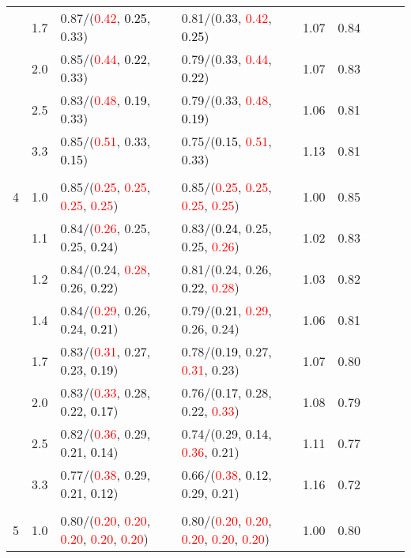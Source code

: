 \documentclass[10pt,a4paper]{report}
\begin{document}
\begin{table}[!htbp]
\begin{center}
{\begin{tabular}{ccllccccc}
			&1.7&0.87/(\textcolor{red}{0.42}, \textcolor{black}{0.25}, 0.33)&0.81/(0.33, \textcolor{red}{0.42}, \textcolor{black}{0.25})&1.07&0.84\\
			&2.0&0.85/(\textcolor{red}{0.44}, \textcolor{black}{0.22}, 0.33)&0.79/(0.33, \textcolor{red}{0.44}, \textcolor{black}{0.22})&1.07&0.83\\
			&2.5&0.83/(\textcolor{red}{0.48}, \textcolor{black}{0.19}, 0.33)&0.79/(0.33, \textcolor{red}{0.48}, \textcolor{black}{0.19})&1.06&0.81\\
			&3.3&0.85/(\textcolor{red}{0.51}, 0.33, \textcolor{black}{0.15})&0.75/(\textcolor{black}{0.15}, \textcolor{red}{0.51}, 0.33)&1.13&0.81\\
			&&&&\\
			4			&1.0&0.85/(\textcolor{red}{0.25}, \textcolor{red}{0.25}, \textcolor{red}{0.25}, \textcolor{red}{0.25})&0.85/(\textcolor{red}{0.25}, \textcolor{red}{0.25}, \textcolor{red}{0.25}, \textcolor{red}{0.25})&1.00&0.85\\
			&1.1&0.84/(\textcolor{red}{0.26}, 0.25, 0.25, \textcolor{black}{0.24})&0.83/(\textcolor{black}{0.24}, 0.25, 0.25, \textcolor{red}{0.26})&1.02&0.83\\
			&1.2&0.84/(0.24, \textcolor{red}{0.28}, 0.26, \textcolor{black}{0.22})&0.81/(0.24, 0.26, \textcolor{black}{0.22}, \textcolor{red}{0.28})&1.03&0.82\\
			&1.4&0.84/(\textcolor{red}{0.29}, 0.26, 0.24, \textcolor{black}{0.21})&0.79/(\textcolor{black}{0.21}, \textcolor{red}{0.29}, 0.26, 0.24)&1.06&0.81\\
			&1.7&0.83/(\textcolor{red}{0.31}, 0.27, 0.23, \textcolor{black}{0.19})&0.78/(\textcolor{black}{0.19}, 0.27, \textcolor{red}{0.31}, 0.23)&1.07&0.80\\
			&2.0&0.83/(\textcolor{red}{0.33}, 0.28, 0.22, \textcolor{black}{0.17})&0.76/(\textcolor{black}{0.17}, 0.28, 0.22, \textcolor{red}{0.33})&1.08&0.79\\
			&2.5&0.82/(\textcolor{red}{0.36}, 0.29, 0.21, \textcolor{black}{0.14})&0.74/(0.29, \textcolor{black}{0.14}, \textcolor{red}{0.36}, 0.21)&1.11&0.77\\
			&3.3&0.77/(\textcolor{red}{0.38}, 0.29, 0.21, \textcolor{black}{0.12})&0.66/(\textcolor{red}{0.38}, \textcolor{black}{0.12}, 0.29, 0.21)&1.16&0.72\\
			&&&&\\
			5			&1.0&0.80/(\textcolor{red}{0.20}, \textcolor{red}{0.20}, \textcolor{red}{0.20}, \textcolor{red}{0.20}, \textcolor{red}{0.20})&0.80/(\textcolor{red}{0.20}, \textcolor{red}{0.20}, \textcolor{red}{0.20}, \textcolor{red}{0.20}, \textcolor{red}{0.20})&1.00&0.80\\

\end{tabular}}
\end{center}
\end{table}
\end{document}

